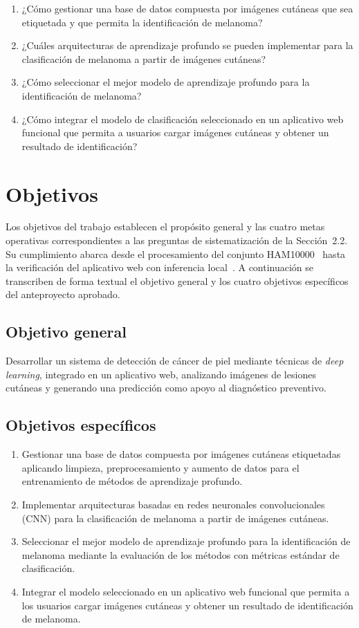 \begin{enumerate}
  \item ¿Cómo gestionar una base de datos compuesta por imágenes cutáneas que sea etiquetada y que permita la identificación de melanoma?
  \item ¿Cuáles arquitecturas de aprendizaje profundo se pueden implementar para la clasificación de melanoma a partir de imágenes cutáneas?
  \item ¿Cómo seleccionar el mejor modelo de aprendizaje profundo para la identificación de me\-la\-no\-ma?
  \item ¿Cómo integrar el modelo de clasificación seleccionado en un aplicativo web funcional que permita a usuarios cargar imágenes cutáneas y obtener un resultado de identificación?
\end{enumerate}

\section{Objetivos}

Los objetivos del trabajo establecen el propósito general y las cuatro metas operativas correspondientes a las preguntas de sistematización de la Sección~2.2. Su cumplimiento abarca desde el procesamiento del conjunto HAM10000~\cite{tschandl2018ham10000} hasta la verificación del aplicativo web con inferencia local~\cite{ning2024onnxweb,wang2025browser}. A continuación se transcriben de forma textual el objetivo general y los cuatro objetivos específicos del anteproyecto aprobado.

\subsection{Objetivo general}

Desarrollar un sistema de detección de cáncer de piel mediante técnicas de \textit{deep learning}, integrado en un aplicativo web, analizando imágenes de lesiones cutáneas y generando una predicción como apoyo al diagnóstico preventivo.

\subsection{Objetivos específicos}

\begin{enumerate}
  \item Gestionar una base de datos compuesta por imágenes cutáneas etiquetadas aplicando limpieza, preprocesamiento y aumento de datos para el entrenamiento de métodos de aprendizaje profundo.
  \item Implementar arquitecturas basadas en redes neuronales convolucionales (CNN) para la clasificación de melanoma a partir de imágenes cutáneas.
  \item Seleccionar el mejor modelo de aprendizaje profundo para la identificación de melanoma mediante la evaluación de los métodos con métricas estándar de clasificación.
  \item Integrar el modelo seleccionado en un aplicativo web funcional que permita a los usuarios cargar imágenes cutáneas y obtener un resultado de identificación de melanoma.
\end{enumerate}

